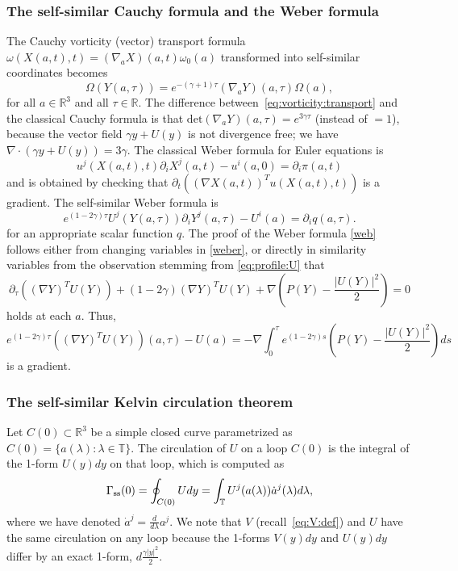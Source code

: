 \documentclass[11pt,reqno]{amsproc}
\numberwithin{equation}{section}
\theoremstyle{remark}
\newcommand{\pa}{\partial}
\newcommand{\la}{\label}
\newcommand{\fr}{\frac}
\newcommand{\na}{\nabla}
\newcommand{\be}{\begin{equation}}
\newcommand{\ee}{\end{equation}}
\newcommand{\Rr}{{\mathbb R}}
\begin{document}
{\subsubsection{The self-similar Cauchy formula and the Weber formula}
The Cauchy vorticity (vector) transport formula   $\omega(X(a,t),t) =  (\nabla_{a} X)(a,t)  \omega_0 (a)$ transformed into self-similar coordinates becomes
\begin{equation}
\Omega(Y(a,\tau)) = e^{-(\gamma+1)\tau}  (\nabla_{a}Y)(a,\tau) \Omega(a) ,
\label{eq:vorticity:transport}
\end{equation}
for all $a \in \mathbb{R}^3$ and all $\tau\in \Rr$.
The difference between~\eqref{eq:vorticity:transport} and the classical Cauchy formula is that $\mathrm{det}(\nabla_a Y)(a,\tau) = e^{3\gamma \tau}$ (instead of $=1$), because the vector field $\gamma y + U(y)$ is not divergence free; we have $ \nabla \cdot (\gamma y+U(y)) = 3\gamma$. 
The classical Weber formula for Euler equations is
\be
u^j(X(a,t),t)\pa_iX^j(a,t) - u^i(a,0) = \pa_i \pi(a,t)
\la{weber}
\ee
and is obtained by checking that $\pa_t((\na X(a,t))^T u(X(a,t),t))$ is a gradient. The self-similar Weber formula is
\be
e^{(1-2\gamma)\tau} U^j(Y(a,\tau))\pa_i Y^j(a,\tau) - U^i(a) = \pa_i q(a,\tau).
\la{web}
\ee
for an appropriate scalar function $q$. The proof of the Weber formula \eqref{web}  follows either from changing variables in \eqref{weber}, or directly in similarity variables from the observation stemming from \eqref{eq:profile:U}
that
\begin{equation*}
\pa_{\tau}( (\na Y)^TU(Y)) + (1-2\gamma) (\na Y)^TU(Y) + \na\left (P(Y) - \fr{|U(Y)|^2}{2}\right) =0
\end{equation*}
holds at each $a$. Thus,
\begin{equation*}
e^{(1-2\gamma)\tau} ((\na Y)^TU(Y))(a,\tau) - U(a) = -\na  \int_0^{\tau} e^{(1-2\gamma)s}\left (P(Y) - \fr{|U(Y)|^2}{2}\right)ds
\end{equation*}
is a gradient.


\subsubsection{The self-similar Kelvin circulation theorem}

Let $C(0) \subset \mathbb{R}^3$ be a simple closed curve parametrized as $C(0) = \{ a(\lambda) \colon \lambda \in \mathbb{T}\}$.
The circulation of $U$ on a loop $C(0)$ is the integral of the 1-form $U(y)dy$ on that loop, which is computed as
\be
\Gamma_{\rm{ss}}(0) = \oint_{C(0)} Udy = \int_{\mathbb T} U^j(a(\lambda))\dot{a}^j(\lambda)d\lambda,
\la{Gammazero}
\ee
where we have denoted $\dot{a}^j = \frac{d}{d\lambda} a^j$. We note that  $V$ (recall~\eqref{eq:V:def}) and $U$ have the same circulation on any loop because the 1-forms $V(y)dy$ and $U(y)dy$ differ by an exact 1-form, $d\fr{\gamma |y|^2}{2}$.

}
\end{document}
